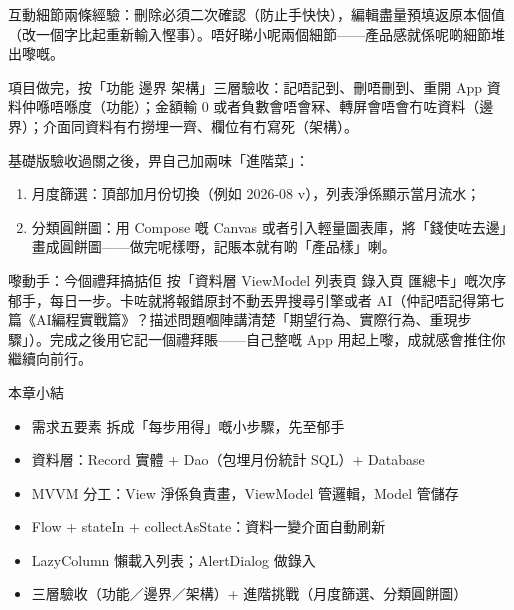 互動細節兩條經驗：刪除必須二次確認（防止手快快），編輯盡量預填返原本個值（改一個字比起重新輸入慳事）。唔好睇小呢兩個細節——產品感就係呢啲細節堆出嚟嘅。



項目做完，按「功能 邊界 架構」三層驗收：記唔記到、刪唔刪到、重開 App 資料仲喺唔喺度（功能）；金額輸 0 或者負數會唔會冧、轉屏會唔會冇咗資料（邊界）；介面同資料有冇撈埋一齊、欄位有冇寫死（架構）。

基礎版驗收過關之後，畀自己加兩味「進階菜」：

\begin{enumerate}
  \item 月度篩選：頂部加月份切換（例如 2026-08 v），列表淨係顯示當月流水；
  \item 分類圓餅圖：用 Compose 嘅 Canvas 或者引入輕量圖表庫，將「錢使咗去邊」畫成圓餅圖——做完呢樣嘢，記賬本就有啲「產品樣」喇。
\end{enumerate}

\begin{tcbpractice}{嚟動手：今個禮拜搞掂佢}
按「資料層 ViewModel 列表頁 錄入頁 匯總卡」嘅次序郁手，每日一步。卡咗就將報錯原封不動丟畀搜尋引擎或者 AI（仲記唔記得第七篇《AI編程實戰篇》？描述問題嗰陣講清楚「期望行為、實際行為、重現步驟」）。完成之後用它記一個禮拜賬——自己整嘅 App 用起上嚟，成就感會推住你繼續向前行。

\end{tcbpractice}

\begin{tcbsummary}{本章小結}
\begin{itemize}
  \item 需求五要素 拆成「每步用得」嘅小步驟，先至郁手
  \item 資料層：Record 實體 + Dao（包埋月份統計 SQL）+ Database
  \item MVVM 分工：View 淨係負責畫，ViewModel 管邏輯，Model 管儲存
  \item Flow + stateIn + collectAsState：資料一變介面自動刷新
  \item LazyColumn 懶載入列表；AlertDialog 做錄入
  \item 三層驗收（功能／邊界／架構）+ 進階挑戰（月度篩選、分類圓餅圖）
\end{itemize}

\end{tcbsummary}
